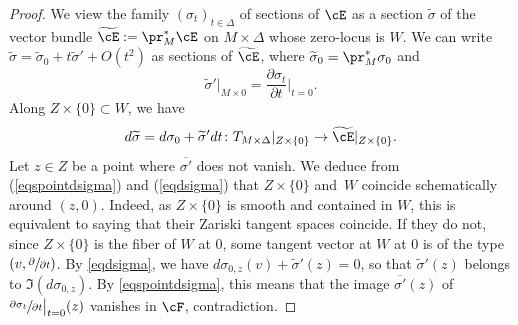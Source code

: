 \begin{proof}
We view the family $(\sigma_t)_{t\in \Delta}$ of sections of $\cE$ as a section $\widetilde\sigma$
of the vector bundle $\widetilde{\cE}:=\pr_M^* \cE$
on $M\times \Delta$ whose zero-locus is $W$. We can write $\widetilde\sigma=\widetilde\sigma_0+t\widetilde\sigma'+O(t^2)$ as sections of $\widetilde{\cE}$, where
$\widetilde\sigma_0=\pr_M^*\sigma_0$ and
\begin{equation}\label{eqspointdsigma}
\widetilde \sigma'\vert_{ M\times 0}=\frac{\partial\sigma_t}{\partial t}\Big\vert_{t=0}
.
\end{equation}
Along $Z\times \{0\}\subset W $, we have
\begin{equation}\label{eqdsigma}
d\widetilde\sigma=d \sigma_0+\widetilde\sigma' dt\colon T_{M\times\Delta}\vert_{Z\times \{0\}} \to \widetilde{\cE}\vert_{Z\times \{0\}}.
\end{equation}
Let $z\in Z$ be a point where $\overline {\sigma'} $ does not vanish. We deduce from (\ref{eqspointdsigma}) and (\ref{eqdsigma}) that $Z\times \{0\}$ and~$W$ coincide schematically around $(z,0)$. Indeed, as $Z\times \{0\}$ is smooth and contained in $W$, this is equivalent to saying that their Zariski tangent spaces
coincide. If they do not, since $Z\times \{0\}$ is the fiber of $W$ at $0$, some tangent vector at $W$ at $0$ is of the type $ (v,\sfrac{\partial}{\partial t})$. By \eqref{eqdsigma}, we have
$d \sigma_{0,z}(v)+\widetilde\sigma'(z)=0$, so that $\widetilde\sigma'(z)$ belongs to $\Im (d \sigma_{0,z})$. By \eqref{eqspointdsigma}, this means that the image $\overline {\sigma'} (z) $ of
$\sfrac{\partial\sigma_t}{\partial t}\big\vert_{t=0}(z)$ vanishes in $\cF$, contradiction.


\end{proof}
